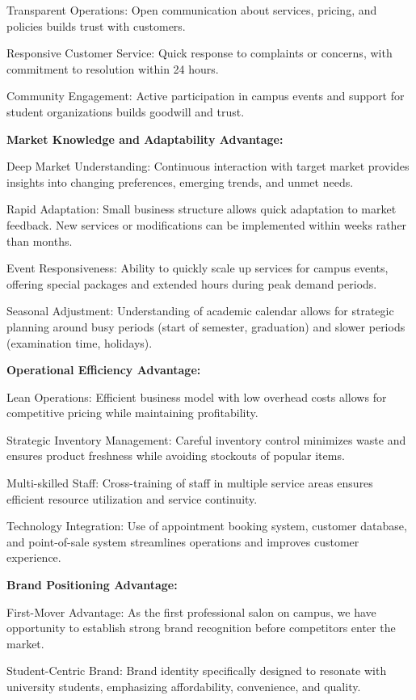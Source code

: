 Transparent Operations: Open communication about services, pricing, and policies builds trust with customers.

Responsive Customer Service: Quick response to complaints or concerns, with commitment to resolution within 24 hours.

Community Engagement: Active participation in campus events and support for student organizations builds goodwill and trust.

\textbf{Market Knowledge and Adaptability Advantage:}

Deep Market Understanding: Continuous interaction with target market provides insights into changing preferences, emerging trends, and unmet needs.

Rapid Adaptation: Small business structure allows quick adaptation to market feedback. New services or modifications can be implemented within weeks rather than months.

Event Responsiveness: Ability to quickly scale up services for campus events, offering special packages and extended hours during peak demand periods.

Seasonal Adjustment: Understanding of academic calendar allows for strategic planning around busy periods (start of semester, graduation) and slower periods (examination time, holidays).

\textbf{Operational Efficiency Advantage:}

Lean Operations: Efficient business model with low overhead costs allows for competitive pricing while maintaining profitability.

Strategic Inventory Management: Careful inventory control minimizes waste and ensures product freshness while avoiding stockouts of popular items.

Multi-skilled Staff: Cross-training of staff in multiple service areas ensures efficient resource utilization and service continuity.

Technology Integration: Use of appointment booking system, customer database, and point-of-sale system streamlines operations and improves customer experience.

\textbf{Brand Positioning Advantage:}

First-Mover Advantage: As the first professional salon on campus, we have opportunity to establish strong brand recognition before competitors enter the market.

Student-Centric Brand: Brand identity specifically designed to resonate with university students, emphasizing affordability, convenience, and quality.

